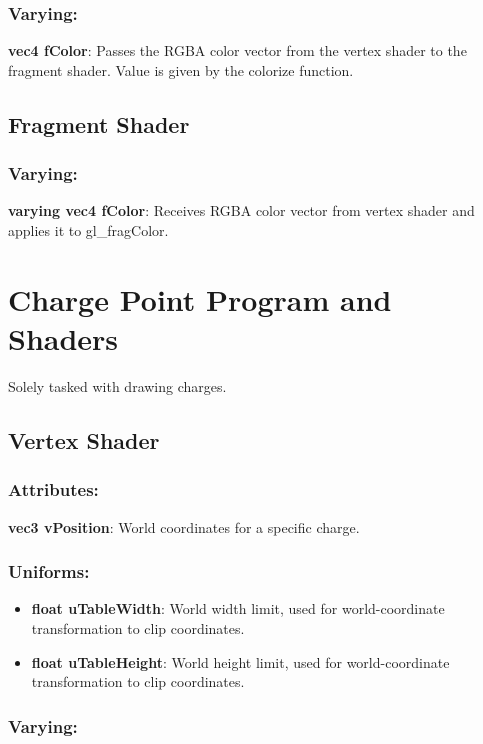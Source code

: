\documentclass[10pt]{report}
\begin{document}
\subsubsection{Varying:}

\textbf{vec4 fColor}: Passes the RGBA color vector from the vertex shader to the fragment shader. Value is given by the colorize function.

\subsection{Fragment Shader}
	
\subsubsection{Varying:}

\textbf{varying vec4 fColor}: Receives RGBA color vector from vertex shader and applies it to gl\_fragColor. 
	
\section{Charge Point Program and Shaders}

Solely tasked with drawing charges.

\subsection{Vertex Shader}

\subsubsection{Attributes:}

\textbf{vec3 vPosition}: World coordinates for a specific charge.

\subsubsection{Uniforms:}

\begin{itemize}
    \item \textbf{float uTableWidth}: World width limit, used for world-coordinate transformation to clip coordinates.
    \item \textbf{float uTableHeight}: World height limit, used for world-coordinate transformation to clip coordinates.
\end{itemize} 

\subsubsection{Varying:}
\end{document}
